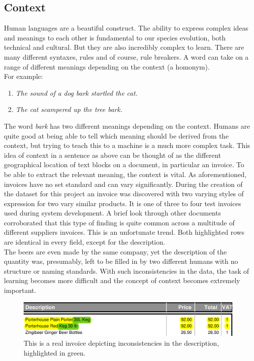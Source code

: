 \subsection{Context}
\label{sec:context}
Human languages are a beautiful construct. The ability to express complex ideas and meanings to each other is fundamental
to our species evolution, both technical and cultural. But they are also incredibly complex to learn. There are many different syntaxes, rules and
of course, rule breakers. A word can take on a range of different meanings depending on the context (a homonym). \\
For example:
\begin{enumerate}
	\item \emph{The sound of a dog bark startled the cat.}
	\item \emph{The cat scampered up the tree bark.}
\end{enumerate}
The word \emph{bark} has two different meanings depending on the context. Humans are quite good at being able to tell which meaning
should be derived from the context, but trying to teach this to a machine is a much more complex task.
\bigbreak
This idea of context in a sentence as above can be thought of as the different geographical location of text blocks on a document,
in particular an invoice. To be able to extract the relevant meaning, the context is vital. As aforementioned, invoices
have no set standard and can vary significantly. During the creation of the dataset for this project an invoice was discovered
with two varying styles of expression for two vary similar products. It is one of three to four test invoices used during system
development. A brief look through other documents corroborated that this type of finding is quite common across a multitude of
different suppliers invoices. This is an unfortunate trend.
\bigbreak
Both highlighted rows are identical in every field, except for the description.\\
The beers are even made by the same company, yet the description of the quantity was, presumably, left to be filled in by two different humans with
no structure or naming standards. With such inconsistencies in the data, the task of learning becomes more difficult and the concept of context
becomes extremely important.
\begin{figure}[H]
	\centering
	\includegraphics[width=1\linewidth]{figures/invo_complexity.png}
	\caption[Invoice depicting inconsistencies]{This is a real invoice depicting inconsistencies in the description, highlighted in green.}
	\label{fig:context}
\end{figure}
